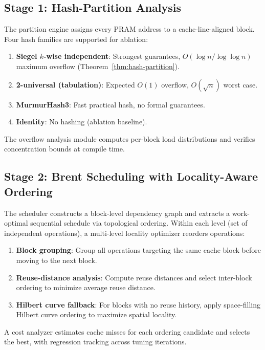 \documentclass[11pt]{article}
\begin{document}
\subsection{Stage 1: Hash-Partition Analysis}

The partition engine assigns every PRAM address to a cache-line-aligned
block.  Four hash families are supported for ablation:

\begin{enumerate}
\item \textbf{Siegel $k$-wise independent}: Strongest guarantees,
  $O(\!\log n/\log\log n)$ maximum overflow (Theorem~\ref{thm:hash-partition}).
\item \textbf{2-universal (tabulation)}: Expected $O(1)$ overflow,
  $O(\sqrt{n})$ worst case.
\item \textbf{MurmurHash3}: Fast practical hash, no formal guarantees.
\item \textbf{Identity}: No hashing (ablation baseline).
\end{enumerate}

The overflow analysis module computes per-block load distributions and
verifies concentration bounds at compile time.

\subsection{Stage 2: Brent Scheduling with Locality-Aware Ordering}

The scheduler constructs a block-level dependency graph and extracts a
work-optimal sequential schedule via topological ordering.  Within each
level (set of independent operations), a multi-level locality optimizer
reorders operations:

\begin{enumerate}
\item \textbf{Block grouping}: Group all operations targeting the same
  cache block before moving to the next block.
\item \textbf{Reuse-distance analysis}: Compute reuse distances and
  select inter-block ordering to minimize average reuse distance.
\item \textbf{Hilbert curve fallback}: For blocks with no reuse history,
  apply space-filling Hilbert curve ordering to maximize spatial locality.
\end{enumerate}

A cost analyzer estimates cache misses for each ordering candidate and
selects the best, with regression tracking across tuning iterations.
\end{document}
